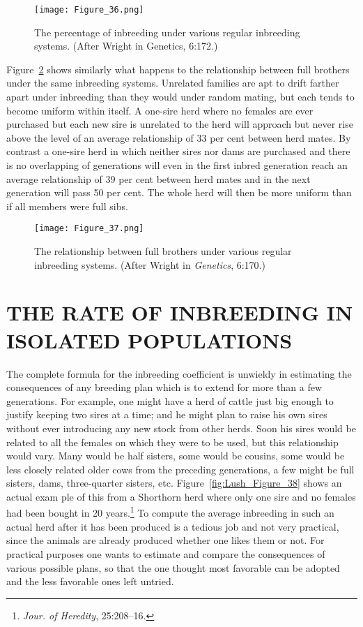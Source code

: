 \begin{figure}
	\centering
    \texttt{[image: Figure\_36.png]}
    \caption{The percentage of inbreeding under various regular inbreeding systems.
(After Wright in Genetics, 6:172.)}
    \label{fig:Lush_Figure_36}
\end{figure}

Figure~\ref{fig:Lush_Figure_37} shows similarly what happens to the relationship between
full brothers under the same inbreeding systems. Unrelated families
are apt to drift farther apart under inbreeding than they would under
random mating, but each tends to become uniform within itself. A one-sire
herd where no females are ever purchased but each new sire is
unrelated to the herd will approach but never rise above the level of an
average relationship of 33 per cent between herd mates. By contrast
a one-sire herd in which neither sires nor dams are purchased and there
is no overlapping of generations will even in the first inbred generation
reach an average relationship of 39 per cent between herd mates and in
the next generation will pass 50 per cent. The whole herd will then be
more uniform than if all members were full sibs.

\begin{figure}
	\centering
    \texttt{[image: Figure\_37.png]}
    \caption{The relationship between full brothers under various regular inbreeding
systems. (After Wright in \textit{Genetics}, 6:170.)}
    \label{fig:Lush_Figure_37}
\end{figure}

\section*{THE RATE OF INBREEDING IN ISOLATED POPULATIONS}

The complete formula for the inbreeding coefficient is unwieldy in
estimating the consequences of any breeding plan which is to extend for
more than a few generations. For example, one might have a herd of
cattle just big enough to justify keeping two sires at a time; and he
might plan to raise his own sires without ever introducing any new
stock from other herds. Soon his sires would be related to all the females
on which they were to be used, but this relationship would vary. Many
would be half sisters, some would be cousins, some would be less closely
related older cows from the preceding generations, a few might be full
sisters, dams, three-quarter sisters, etc. Figure~\ref{fig:Lush_Figure_38}
shows an actual exam ple of this from a Shorthorn herd where only one sire
and no females 	had been bought in 20 years.\footnote{\textit{Jour. of Heredity},
25:208--16.} To compute the average inbreeding in
such an actual herd after it has been produced is a tedious job and not
very practical, since the animals are already produced whether one
likes them or not. For practical purposes one wants to estimate and
compare the consequences of various possible plans, so that the one
thought most favorable can be adopted and the less favorable ones left
untried.

